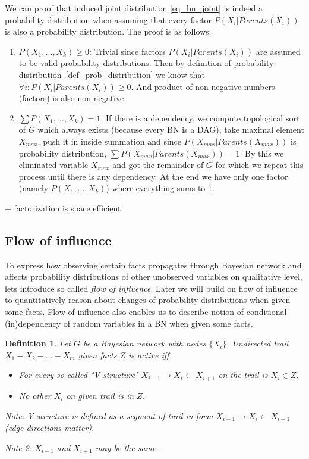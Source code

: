 \documentclass[english,cover]{fitthesis} %
\newtheorem{math_def}{Definition}[chapter] %
\newcommand{\term}[1]{\emph{#1}}           %
\newcommand{\todo}[1]{{\color{red} #1}}
\newcommand{\uncertain}[1]{{\color{magenta} #1}}
\begin{document}
We can proof \cite{myself} that induced joint distribution \eqref{eq_bn_joint} is indeed a probability distribution when assuming that every factor $P(X_i | Parents(X_i))$ is also a probability distribution. The proof is as follows:
\begin{enumerate}
   \item $P(X_1, \dots, X_k) \geq 0$:
       Trivial since factors $P(X_i | Parents(X_i))$ are assumed to be valid probability distributions. Then by definition of probability distribution~\ref{def_prob_distribution} we know that $\forall i: P(X_i | Parents(X_i)) \geq 0$. And product of non-negative numbers (factors) is also non-negative.
   \item $\sum P(X_1, \dots, X_k) = 1$:
       If there is a dependency, we compute topological sort of $G$ which always exists (because every BN is a DAG), take maximal element $X_{max}$, push it in inside summation and since $P(X_{max} | Parents(X_{max}))$ is probability distribution, $\sum P(X_{max} | Parents(X_{max})) = 1$. By this we eliminated variable $X_{max}$ and got the remainder of $G$ for which we repeat this process until there is any dependency. At the end we have only one factor (namely $P(X_1, \dots, X_k)$) where everything sums to 1.
\end{enumerate}


\todo{+ factorization is space efficient}



\subsection{Flow of influence}
To express how observing certain facts propagates through Bayesian network and affects probability distributions of other unobserved variables on qualitative level, lets introduce so called \term{flow of influence}. \uncertain{Later we will build on flow of influence to quantitatively reason about changes of probability distributions when given some facts.} Flow of influence also enables us to describe notion of conditional (in)dependency of random variables in a BN when given some facts. 
\begin{math_def}
    Let $G$ be a Bayesian network with nodes $\lbrace X_i \rbrace$. Undirected trail $X_1 - X_2 - \dots - X_m$ given facts $Z$ is active iff
    \begin{itemize}
        \item For every so called "V-structure" $X_{i-1} \rightarrow X_i \leftarrow X_{i+1}$ on the trail is $X_i \in Z$.
        \item No other $X_i$ on given trail is in $Z$.
    \end{itemize}
    Note: V-structure is defined as a segment of trail in form $X_{i-1} \rightarrow X_i \leftarrow X_{i+1}$ (edge directions matter).
    
    Note 2: $X_{i-1}$ and $X_{i+1}$ may be the same.
\end{math_def}
\end{document}
